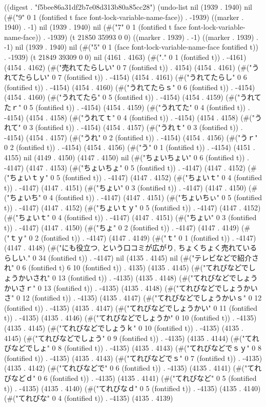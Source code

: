 
((digest . "f5bee86a31df2b7e08d313b80a85cc28") (undo-list nil (1939 . 1940) nil (#("9" 0 1 (fontified t face font-lock-variable-name-face)) . -1939) ((marker . 1940) . -1) nil (1939 . 1940) nil (#("7" 0 1 (fontified t face font-lock-variable-name-face)) . -1939) (t 21850 35993 0 0) ((marker . 1939) . -1) ((marker . 1939) . -1) nil (1939 . 1940) nil (#("5" 0 1 (face font-lock-variable-name-face fontified t)) . -1939) (t 21849 39309 0 0) nil (4161 . 4163) (#("." 0 1 (fontified t)) . -4161) (4154 . 4162) (#("売れてたらしい" 0 7 (fontified t)) . 4154) (4154 . 4161) (#("うれてたらしい" 0 7 (fontified t)) . -4154) (4154 . 4161) (#("うれてたらし" 0 6 (fontified t)) . -4154) (4154 . 4160) (#("うれてたらｓ" 0 6 (fontified t)) . -4154) (4154 . 4160) (#("うれてたら" 0 5 (fontified t)) . -4154) (4154 . 4159) (#("うれてたｒ" 0 5 (fontified t)) . -4154) (4154 . 4159) (#("うれてた" 0 4 (fontified t)) . -4154) (4154 . 4158) (#("うれてｔ" 0 4 (fontified t)) . -4154) (4154 . 4158) (#("うれて" 0 3 (fontified t)) . -4154) (4154 . 4157) (#("うれｔ" 0 3 (fontified t)) . -4154) (4154 . 4157) (#("うれ" 0 2 (fontified t)) . -4154) (4154 . 4156) (#("うｒ" 0 2 (fontified t)) . -4154) (4154 . 4156) (#("う" 0 1 (fontified t)) . -4154) (4151 . 4155) nil (4149 . 4150) (4147 . 4150) nil (#("ちょいちょい" 0 6 (fontified t)) . -4147) (4147 . 4153) (#("ちょいちょ" 0 5 (fontified t)) . -4147) (4147 . 4152) (#("ちょいｔｙ" 0 5 (fontified t)) . -4147) (4147 . 4152) (#("ちょいｔ" 0 4 (fontified t)) . -4147) (4147 . 4151) (#("ちょい" 0 3 (fontified t)) . -4147) (4147 . 4150) (#("ちょいち" 0 4 (fontified t)) . -4147) (4147 . 4151) (#("ちょいちぃ" 0 5 (fontified t)) . -4147) (4147 . 4152) (#("ちょいｔｙ" 0 5 (fontified t)) . -4147) (4147 . 4152) (#("ちょいｔ" 0 4 (fontified t)) . -4147) (4147 . 4151) (#("ちょい" 0 3 (fontified t)) . -4147) (4147 . 4150) (#("ちょ" 0 2 (fontified t)) . -4147) (4147 . 4149) (#("ｔｙ" 0 2 (fontified t)) . -4147) (4147 . 4149) (#("ｔ" 0 1 (fontified t)) . -4147) (4147 . 4148) (#("にも役立つ, という口コミが広がり, ちょくちょく売れているらしい." 0 34 (fontified t)) . -4147) nil (4135 . 4145) nil (#("テレビなどで紹介され" 0 6 (fontified t) 6 10 (fontified t)) . 4135) (4135 . 4145) (#("てれびなどでしょうかいされ" 0 13 (fontified t)) . -4135) (4135 . 4148) (#("てれびなどでしょうかいさｒ" 0 13 (fontified t)) . -4135) (4135 . 4148) (#("てれびなどでしょうかいさ" 0 12 (fontified t)) . -4135) (4135 . 4147) (#("てれびなどでしょうかいｓ" 0 12 (fontified t)) . -4135) (4135 . 4147) (#("てれびなどでしょうかい" 0 11 (fontified t)) . -4135) (4135 . 4146) (#("てれびなどでしょうか" 0 10 (fontified t)) . -4135) (4135 . 4145) (#("てれびなどでしょうｋ" 0 10 (fontified t)) . -4135) (4135 . 4145) (#("てれびなどでしょう" 0 9 (fontified t)) . -4135) (4135 . 4144) (#("てれびなどでしょ" 0 8 (fontified t)) . -4135) (4135 . 4143) (#("てれびなどでｓｙ" 0 8 (fontified t)) . -4135) (4135 . 4143) (#("てれびなどでｓ" 0 7 (fontified t)) . -4135) (4135 . 4142) (#("てれびなどで" 0 6 (fontified t)) . -4135) (4135 . 4141) (#("てれびなどｄ" 0 6 (fontified t)) . -4135) (4135 . 4141) (#("てれびなど" 0 5 (fontified t)) . -4135) (4135 . 4140) (#("てれびなｄ" 0 5 (fontified t)) . -4135) (4135 . 4140) (#("てれびな" 0 4 (fontified t)) . -4135) (4135 . 4139) 